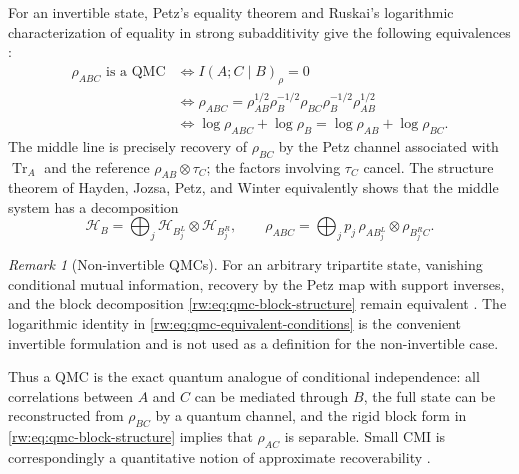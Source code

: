 \documentclass[11pt]{article}
\theoremstyle{remark}
\newtheorem{remark}[remark]{Remark}
\newcommand{\1}{\mathbbm{1}}
\begin{document}
For an invertible state, Petz's equality theorem and Ruskai's logarithmic
characterization of equality in strong subadditivity give the following
equivalences
\cite{Petz-SufficiencyChannels-1978,petz2003monotonicity}%
\cite[Theorem~1]{ruskai2002inequalities}:
\begin{equation}
 \begin{aligned}
 \rho_{ABC}\text{ is a QMC}
 &\Longleftrightarrow I(A;C\mid B)_\rho=0\\
 &\Longleftrightarrow
 \rho_{ABC}
 =\rho_{AB}^{1/2}\rho_B^{-1/2}\rho_{BC}
   \rho_B^{-1/2}\rho_{AB}^{1/2}\\
 &\Longleftrightarrow
 \log\rho_{ABC}+\log\rho_B
 =\log\rho_{AB}+\log\rho_{BC}.
 \end{aligned}
 \label{rw:eq:qmc-equivalent-conditions}
\end{equation}
The middle line is precisely recovery of $\rho_{BC}$ by the Petz
channel associated with $\operatorname{Tr}_A$ and the reference
$\rho_{AB}\otimes\tau_C$; the factors involving $\tau_C$ cancel.
The structure theorem of Hayden, Jozsa, Petz, and Winter
\cite{hayden-2004} equivalently shows that the middle system has a
decomposition
\begin{equation}
 \mathcal H_B
 =\bigoplus_j\mathcal H_{B_j^L}\otimes\mathcal H_{B_j^R},
 \qquad
 \rho_{ABC}
 =\bigoplus_j p_j\,
   \rho_{AB_j^L}\otimes\rho_{B_j^RC}.
 \label{rw:eq:qmc-block-structure}
\end{equation}
\begin{remark}[Non-invertible QMCs]
For an arbitrary tripartite state, vanishing conditional mutual
information, recovery by the Petz map with support inverses, and the
block decomposition \eqref{rw:eq:qmc-block-structure} remain
equivalent
\cite{Petz-SufficiencyChannels-1978,petz2003monotonicity,hayden-2004}.
The logarithmic identity in
\eqref{rw:eq:qmc-equivalent-conditions} is the convenient invertible
formulation and is not used as a definition for the non-invertible case.
\end{remark}
Thus a QMC is the exact quantum analogue of conditional independence:
all correlations between $A$ and $C$ can be mediated through $B$,
the full state can be reconstructed from $\rho_{BC}$ by a quantum
channel, and the rigid block form in
\eqref{rw:eq:qmc-block-structure} implies that $\rho_{AC}$ is
separable.  Small CMI is correspondingly a quantitative notion of
approximate recoverability \cite{fawzi2015approximate}.
\end{document}
